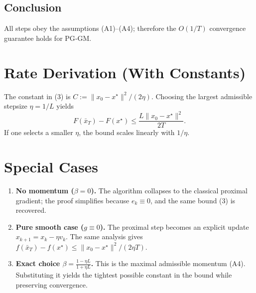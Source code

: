 \documentclass{article}
\begin{document}
\subsection*{Conclusion}
All steps obey the assumptions (A1)–(A4); therefore the $O(1/T)$ convergence guarantee holds for PG‑GM.

\section*{Rate Derivation (With Constants)}
The constant in (3) is $C:=\|x_0-x^{\star}\|^{2}/(2\eta)$.  
Choosing the largest admissible stepsize $\eta=1/L$ yields
\[
F(\bar x_T)-F(x^{\star})\le \frac{L\|x_0-x^{\star}\|^{2}}{2T}.
\]
If one selects a smaller $\eta$, the bound scales linearly with $1/\eta$.

\section*{Special Cases}
\begin{enumerate}
\item \textbf{No momentum ($\beta=0$).}  The algorithm collapses to the classical proximal gradient; the proof simplifies because $e_k\equiv0$, and the same bound (3) is recovered.
\item \textbf{Pure smooth case ($g\equiv0$).}  The proximal step becomes an explicit update $x_{k+1}=x_k-\eta v_k$. The same analysis gives $f(\bar x_T)-f(x^{\star})\le \|x_0-x^{\star}\|^{2}/(2\eta T)$.
\item \textbf{Exact choice $\beta=\frac{1-\eta L}{1+\eta L}$.}  This is the maximal admissible momentum (A4).  Substituting it yields the tightest possible constant in the bound while preserving convergence.
\end{enumerate}
\end{document}
